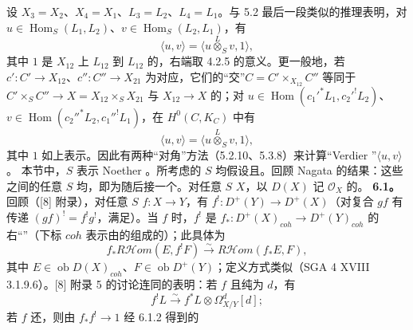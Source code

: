 设 $X_3=X_2$、$X_4=X_1$、$L_3=L_2$、$L_4=L_1$。与 5.2 最后一段类似的推理表明，对 $u\in\operatorname{Hom}_S(L_1,L_2)$、$v\in\operatorname{Hom}_S(L_2,L_1)$，有
\[\langle u,v\rangle=\langle u\mathbin{\overset L\otimes}_Sv,1\rangle,\tag{5.3.7}\]
其中 $1$ 是 $X_{12}$ 上 $L_{12}$ 到 $L_{12}$ 的，右端取 4.2.5 的意义。更一般地，若 $c':C'\to X_{12}$、$c'':C''\to X_{21}$ 为对应，它们的“交”$C=C'\times_{X_{12}}C''$ 等同于 $C'\times_SC''\to X=X_{12}\times_SX_{21}$ 与 $X_{12}\to X$ 的；对 $u\in\operatorname{Hom}(c_1'^*L_1,c_2'^!L_2)$、$v\in\operatorname{Hom}(c_2''^*L_2,c_1''^!L_1)$，在 $H^0(C,K_C)$ 中有
\[\langle u,v\rangle=\langle u\mathbin{\overset L\otimes}_Sv,1\rangle,\tag{5.3.8}\]
其中 $1$ 如上表示。因此有两种“对角”方法（5.2.10、5.3.8）来计算“Verdier ”$\langle u,v\rangle$。
本节中，$S$ 表示 Noether 。所考虑的 $S$ 均假设且。回顾 Nagata 的结果：这些之间的任意 $S$ 均，即为随后接一个。对任意 $S$  $X$，以 $D(X)$ 记 $\mathcal O_X$ 的。
\textbf{6.1。} 回顾（[8] 附录），对任意 $S$  $f:X\to Y$，有 $f^!:D^+(Y)\to D^+(X)$（对复合 $gf$ 有传递 $(gf)^!=f^!g^!$，满足）。当 $f$ 时，$f^!$ 是 $f_*:D^+(X)_{coh}\to D^+(Y)_{coh}$ 的右“”（下标 $coh$ 表示由的组成的）；此具体为
\[f_*R\mathcal Hom(E,f^!F)\xrightarrow\sim R\mathcal Hom(f_*E,F),\tag{6.1.1}\]
其中 $E\in\operatorname{ob}D(X)_{coh}$、$F\in\operatorname{ob}D^+(Y)$；定义方式类似（SGA 4 XVIII 3.1.9.6）。[8] 附录 5 的讨论连同的表明：若 $f$ 且纯为 $d$，有
\[f^!L\xrightarrow\sim f^*L\otimes\Omega^d_{X/Y}[d];\tag{6.1.2}\]
若 $f$ 还，则由 $f_*f^!\to1$ 经 6.1.2 得到的
